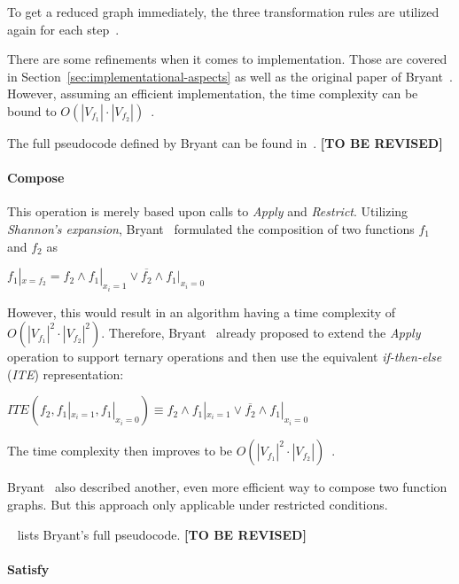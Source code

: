 \documentclass{vldb}
\newcommand{\tbr}{\textbf{[TO BE REVISED]}}
\begin{document}
To get a reduced graph immediately, the three transformation rules are utilized
again for each step~\cite{BRYANT92}.

There are some refinements when it comes to implementation. Those are covered in
Section~\ref{sec:implementational-aspects} as well as the original paper of
Bryant~\cite{BRYANT86, BRYANT92}.  However, assuming an efficient implementation,
the time complexity can be bound to
$O\left(|V_{f_1}| \cdot |V_{f_2}|\right)$~\cite{BRYANT86, BRYANT92}.

The full pseudocode defined by Bryant can be found in~\cite[p. 685]{BRYANT86}. \tbr

\paragraph*{Compose}
\mbox{} %

This operation is merely based upon calls to \textit{Apply} and \textit{Restrict}.
Utilizing \textit{Shannon's expansion}, Bryant~\cite{BRYANT86} formulated the
composition of two functions $f_1$ and $f_2$ as
\begin{center}
$
f_1|_{x=f_2}=
f_2 \land f_1|_{x_i=1} \lor \overline{f_2} \land f_1|_{x_i=0}
$
\end{center}

However, this would result in an algorithm having a time complexity of 
$O\left(|V_{f_1}|^2 \cdot |V_{f_2}|^2\right)$. Therefore, Bryant~\cite{BRYANT86}
already proposed to extend the \textit{Apply} operation to support ternary
operations and then use the equivalent \textit{if-then-else} (\textit{ITE})
representation:
\begin{center}
$
ITE\left(f_2, f_1|_{x_i=1}, f_1|_{x_i=0}\right) \equiv
f_2 \land f_1|_{x_i=1} \lor \overline{f_2} \land f_1|_{x_i=0}
$
\end{center}

\noindent
The time complexity then improves to be
$O\left(|V_{f_1}|^2 \cdot |V_{f_2}|\right)$~\cite{BRYANT86}.

Bryant~\cite{BRYANT86} also described another, even more efficient way to compose
two function graphs. But this approach only applicable under restricted conditions.

~\cite[p. 686]{BRYANT86} lists Bryant's full pseudocode. \tbr

\paragraph*{Satisfy}
\mbox{} %
\end{document}
